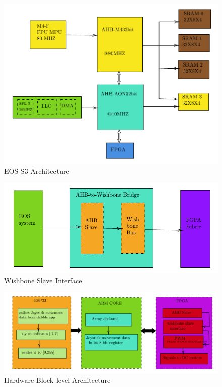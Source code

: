 \begin{enumerate}[label=\thesection.\arabic*.,ref=\thesection.\theenumi]
\begin{figure}[!ht]
\centering
\includegraphics[width=0.5\columnwidth]{ugv/figs/block3}
\centering
\caption{EOS S3 Architecture }
\end{figure}

\begin{figure}[!ht]
\centering
\includegraphics[width=0.5\columnwidth]{ugv/figs/block4}
\centering
\caption{Wishbone Slave Interface  }
\end{figure}
\begin{figure}[!ht]
\centering
\includegraphics[width=0.5\columnwidth]{ugv/figs/block5}
\centering
\caption{Hardware Block level Architecture }
\end{figure}

\end{enumerate}